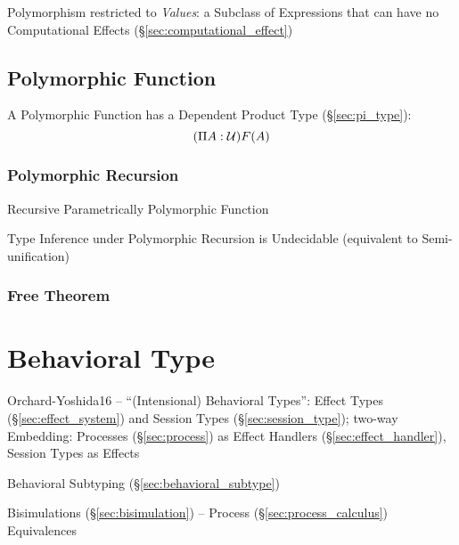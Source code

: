 Polymorphism restricted to \emph{Values}: a Subclass of Expressions
that can have no Computational Effects
(\S\ref{sec:computational_effect})



\subsection{Polymorphic Function}\label{sec:polymorphic_function}

A Polymorphic Function has a Dependent Product Type
(\S\ref{sec:pi_type}):
\[
  (\Pi A:\mathcal{U}) F(A)
\]



\subsubsection{Polymorphic Recursion}\label{sec:polymorphic_recursion}

Recursive Parametrically Polymorphic Function

Type Inference under Polymorphic Recursion is Undecidable (equivalent
to Semi-unification) %



\subsubsection{Free Theorem}\label{sec:free_theorem}



\section{Behavioral Type}\label{sec:behavioral_type}

Orchard-Yoshida16 \cite{orchard-yoshida16} -- ``(Intensional)
Behavioral Types'': Effect Types (\S\ref{sec:effect_system}) and
Session Types (\S\ref{sec:session_type}); two-way Embedding: Processes
(\S\ref{sec:process}) as Effect Handlers (\S\ref{sec:effect_handler}),
Session Types as Effects

\fist Behavioral Subtyping (\S\ref{sec:behavioral_subtype})

\fist Bisimulations (\S\ref{sec:bisimulation}) -- Process
(\S\ref{sec:process_calculus}) Equivalences

